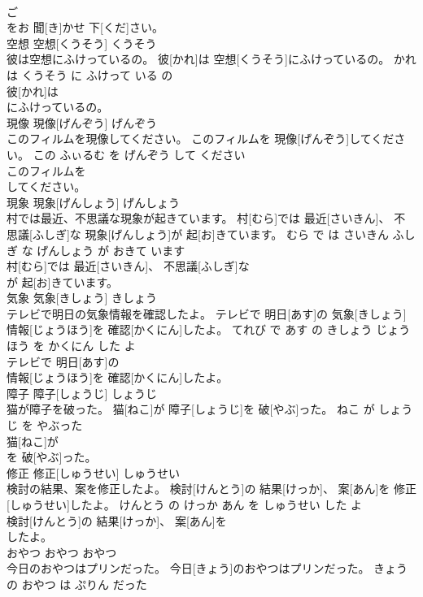 \documentclass[8pt]{extreport}
\begin{document}
\begin{CJK}{UTF8}{min}
\\	ご
\\	をお 聞[き]かせ 下[くだ]さい。			
\\	空想	空想[くうそう]	くうそう	
\\	彼は空想にふけっているの。	彼[かれ]は 空想[くうそう]にふけっているの。	かれ は くうそう に ふけって いる の	
\\	彼[かれ]は
\\	にふけっているの。			
\\	現像	現像[げんぞう]	げんぞう	
\\	このフィルムを現像してください。	このフィルムを 現像[げんぞう]してください。	この ふぃるむ を げんぞう して ください	
\\	このフィルムを
\\	してください。			
\\	現象	現象[げんしょう]	げんしょう	
\\	村では最近、不思議な現象が起きています。	村[むら]では 最近[さいきん]、 不思議[ふしぎ]な 現象[げんしょう]が 起[お]きています。	むら で は さいきん ふしぎ な げんしょう が おきて います	
\\	村[むら]では 最近[さいきん]、 不思議[ふしぎ]な
\\	が 起[お]きています。			
\\	気象	気象[きしょう]	きしょう	
\\	テレビで明日の気象情報を確認したよ。	テレビで 明日[あす]の 気象[きしょう] 情報[じょうほう]を 確認[かくにん]したよ。	てれび で あす の きしょう じょうほう を かくにん した よ	
\\	テレビで 明日[あす]の
\\	情報[じょうほう]を 確認[かくにん]したよ。			
\\	障子	障子[しょうじ]	しょうじ	
\\	猫が障子を破った。	猫[ねこ]が 障子[しょうじ]を 破[やぶ]った。	ねこ が しょうじ を やぶった	
\\	猫[ねこ]が
\\	を 破[やぶ]った。			
\\	修正	修正[しゅうせい]	しゅうせい	
\\	検討の結果、案を修正したよ。	検討[けんとう]の 結果[けっか]、 案[あん]を 修正[しゅうせい]したよ。	けんとう の けっか あん を しゅうせい した よ	
\\	検討[けんとう]の 結果[けっか]、 案[あん]を
\\	したよ。			
\\	おやつ	おやつ	おやつ	
\\	今日のおやつはプリンだった。	今日[きょう]のおやつはプリンだった。	きょう の おやつ は ぷりん だった	

\end{CJK}
\end{document}

